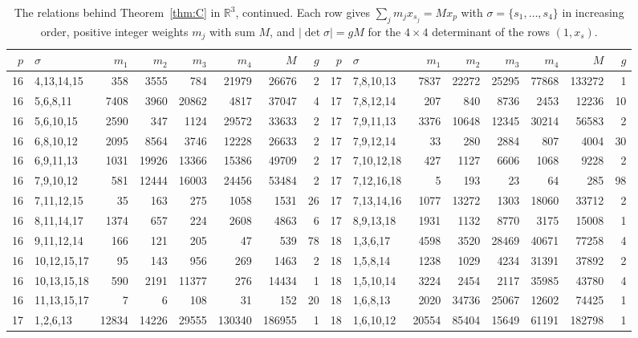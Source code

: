\begin{table}[tp]
\scriptsize
\caption{The relations behind Theorem~\ref{thm:C} in $\mathbb{R}^3$, continued. Each row gives $\sum_j m_j x_{s_j}=M x_p$ with $\sigma=\{s_1,\dots,s_4\}$ in increasing order, positive integer weights $m_j$ with sum $M$, and $|\det\sigma|=gM$ for the $4\times4$ determinant of the rows $(1,x_s)$.}\label{tab:certCthreec}
\begin{ruledtabular}
\begin{tabular}{rlrrrrrr@{\hspace{2.2em}}rlrrrrrr}
$p$ & $\sigma$ & $m_1$ & $m_2$ & $m_3$ & $m_4$ & $M$ & $g$ & $p$ & $\sigma$ & $m_1$ & $m_2$ & $m_3$ & $m_4$ & $M$ & $g$ \\ \hline
16 & 4,13,14,15 & 358 & 3555 & 784 & 21979 & 26676 & 2 & 17 & 7,8,10,13 & 7837 & 22272 & 25295 & 77868 & 133272 & 1 \\
16 & 5,6,8,11 & 7408 & 3960 & 20862 & 4817 & 37047 & 4 & 17 & 7,8,12,14 & 207 & 840 & 8736 & 2453 & 12236 & 10 \\
16 & 5,6,10,15 & 2590 & 347 & 1124 & 29572 & 33633 & 2 & 17 & 7,9,11,13 & 3376 & 10648 & 12345 & 30214 & 56583 & 2 \\
16 & 6,8,10,12 & 2095 & 8564 & 3746 & 12228 & 26633 & 2 & 17 & 7,9,12,14 & 33 & 280 & 2884 & 807 & 4004 & 30 \\
16 & 6,9,11,13 & 1031 & 19926 & 13366 & 15386 & 49709 & 2 & 17 & 7,10,12,18 & 427 & 1127 & 6606 & 1068 & 9228 & 2 \\
16 & 7,9,10,12 & 581 & 12444 & 16003 & 24456 & 53484 & 2 & 17 & 7,12,16,18 & 5 & 193 & 23 & 64 & 285 & 98 \\
16 & 7,11,12,15 & 35 & 163 & 275 & 1058 & 1531 & 26 & 17 & 7,13,14,16 & 1077 & 13272 & 1303 & 18060 & 33712 & 2 \\
16 & 8,11,14,17 & 1374 & 657 & 224 & 2608 & 4863 & 6 & 17 & 8,9,13,18 & 1931 & 1132 & 8770 & 3175 & 15008 & 1 \\
16 & 9,11,12,14 & 166 & 121 & 205 & 47 & 539 & 78 & 18 & 1,3,6,17 & 4598 & 3520 & 28469 & 40671 & 77258 & 4 \\
16 & 10,12,15,17 & 95 & 143 & 956 & 269 & 1463 & 2 & 18 & 1,5,8,14 & 1238 & 1029 & 4234 & 31391 & 37892 & 2 \\
16 & 10,13,15,18 & 590 & 2191 & 11377 & 276 & 14434 & 1 & 18 & 1,5,10,14 & 3224 & 2454 & 2117 & 35985 & 43780 & 4 \\
16 & 11,13,15,17 & 7 & 6 & 108 & 31 & 152 & 20 & 18 & 1,6,8,13 & 2020 & 34736 & 25067 & 12602 & 74425 & 1 \\
17 & 1,2,6,13 & 12834 & 14226 & 29555 & 130340 & 186955 & 1 & 18 & 1,6,10,12 & 20554 & 85404 & 15649 & 61191 & 182798 & 1 \\

\end{tabular}
\end{ruledtabular}
\end{table}
